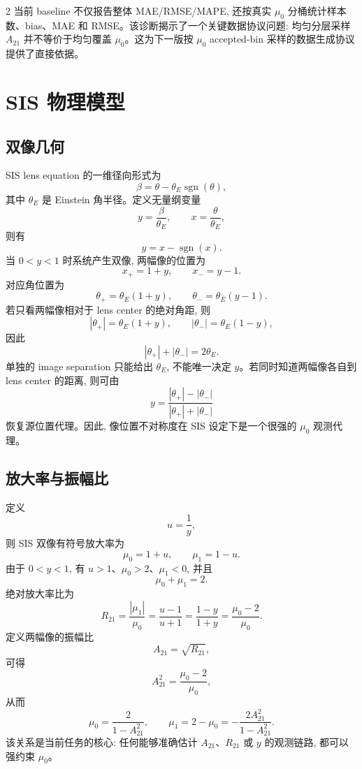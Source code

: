 \documentclass[11pt,a4paper]{ctexart}
\begin{document}
\begin{multicols}{2}
当前 baseline 不仅报告整体 MAE/RMSE/MAPE, 还按真实 \(\mu_0\) 分桶统计样本数、bias、MAE 和 RMSE。该诊断揭示了一个关键数据协议问题: 均匀分层采样 \(A_{21}\) 并不等价于均匀覆盖 \(\mu_0\)。这为下一版按 \(\mu_0\) accepted-bin 采样的数据生成协议提供了直接依据。

\section{SIS 物理模型}
\justifying

\subsection{双像几何}
\justifying

SIS lens equation 的一维径向形式为
\[
    \beta = \theta - \theta_E \operatorname{sgn}(\theta),
\]
其中 \(\theta_E\) 是 Einstein 角半径。定义无量纲变量
\[
    y=\frac{\beta}{\theta_E}, \qquad x=\frac{\theta}{\theta_E},
\]
则有
\[
    y=x-\operatorname{sgn}(x).
\]
当 \(0<y<1\) 时系统产生双像, 两幅像的位置为
\[
    x_+ = 1+y, \qquad x_- = y-1 .
\]
对应角位置为
\[
    \theta_+ = \theta_E(1+y), \qquad
    \theta_- = \theta_E(y-1).
\]
若只看两幅像相对于 lens center 的绝对角距, 则
\[
    |\theta_+|=\theta_E(1+y), \qquad
    |\theta_-|=\theta_E(1-y),
\]
因此
\[
    |\theta_+|+|\theta_-| = 2\theta_E.
\]
单独的 image separation 只能给出 \(\theta_E\), 不能唯一决定 \(y\)。若同时知道两幅像各自到 lens center 的距离, 则可由
\[
    y = \frac{|\theta_+|-|\theta_-|}
             {|\theta_+|+|\theta_-|}
\]
恢复源位置代理。因此, 像位置不对称度在 SIS 设定下是一个很强的 \(\mu_0\) 观测代理。

\subsection{放大率与振幅比}
\justifying

定义
\[
    u=\frac{1}{y},
\]
则 SIS 双像有符号放大率为
\[
    \mu_0 = 1+u, \qquad \mu_1 = 1-u.
\]
由于 \(0<y<1\), 有 \(u>1\)、\(\mu_0>2\)、\(\mu_1<0\), 并且
\[
    \mu_0+\mu_1=2.
\]
绝对放大率比为
\[
    R_{21}=\frac{|\mu_1|}{\mu_0}
          =\frac{u-1}{u+1}
          =\frac{1-y}{1+y}
          =\frac{\mu_0-2}{\mu_0}.
\]
定义两幅像的振幅比
\[
    A_{21} = \sqrt{R_{21}},
\]
可得
\[
    A_{21}^2 = \frac{\mu_0-2}{\mu_0},
\]
从而
\[
    \mu_0 = \frac{2}{1-A_{21}^2}, \qquad
    \mu_1 = 2-\mu_0
           = -\frac{2A_{21}^2}{1-A_{21}^2}.
\]
该关系是当前任务的核心: 任何能够准确估计 \(A_{21}\)、\(R_{21}\) 或 \(y\) 的观测链路, 都可以强约束 \(\mu_0\)。


\end{multicols}
\end{document}
